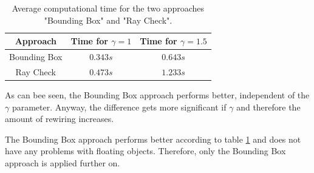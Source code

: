 \begin{table}[H] 
\begin{center}
    \begin{tabular}{ | c | c | c |}
    \hline
    Approach &  Time for $\gamma = 1$ &  Time for $\gamma = 1.5$ \\ \hline
    Bounding Box & $0.343s$  & $0.643s$  \\ \hline
    Ray Check & $0.473s$ & $1.233s$ \\
    \hline
    \end{tabular}
\caption{Average computational time for the two approaches "Bounding Box" and "Ray Check".}
    \label{tab:RayCheck}
\end{center}
\end{table}

As can bee seen, the Bounding Box approach performs better, independent of the $\gamma$ parameter. Anyway, the difference gets more significant if $\gamma$ and therefore the amount of rewiring increases.\newline

The Bounding Box approach performs better according to table \ref{tab:RayCheck} and does not have any problems with floating objects. Therefore, only the Bounding Box approach is applied further on. 








%
%
%
%
%
